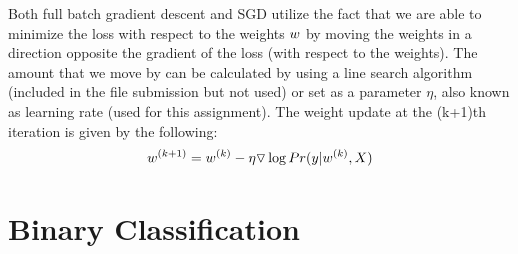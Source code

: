 \documentclass[11pt,letterpaper,titlepage]{article}
\begin{document}
	Both full batch gradient descent and SGD utilize the fact that we are able to minimize the loss with respect to the weights $\boldmath w$ by moving the weights in a direction opposite the gradient of the loss (with respect to the weights). The amount that we move by can be calculated by using a line search algorithm (included in the file submission but not used) or set as a parameter $\eta$, also known as learning rate (used for this assignment). The weight update at the (k+1)th iteration is given by the following:
	\begin{equation}
	\boldmath w^{(k+1)} \unboldmath = \boldmath w^{(k)} \unboldmath - \eta \triangledown \log Pr(\boldmath y \unboldmath | \boldmath w^{(k)} \unboldmath, \boldmath X \unboldmath)
	\end{equation}
	
	\section{Binary Classification}
\end{document}
